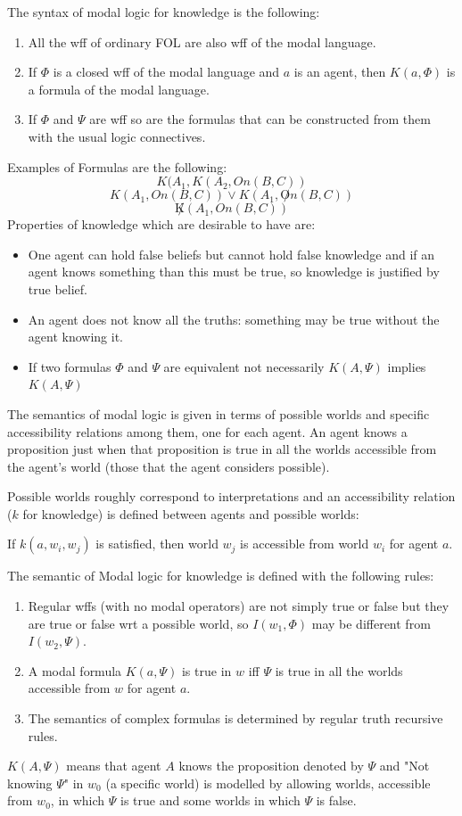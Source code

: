 The syntax of modal logic for knowledge is the following:
\begin{enumerate}
   \item All the wff of ordinary FOL are also wff of the modal language.
   \item If $\Phi$ is a closed wff of the modal language and $a$ is an agent, 
	 then $K(a, \Phi)$ is a formula of the modal language.
   \item If $\Phi$ and $\Psi$ are wff so are the formulas that can be constructed
	 from them with the usual logic connectives.
\end{enumerate}
Examples of Formulas are the following:
\[ K(A_1, K(A_2 , On(B, C)) \]
\[ K(A_1, On(B, C)) \lor K(A_1 , \not On(B, C)) \]
\[ \not K(A_1, On(B, C )) \]
Properties of knowledge which are desirable to have are:
\begin{itemize}
 \item One agent can hold false beliefs but cannot hold false knowledge and if an agent
       knows something than this must be true, so knowledge is justified by true belief.
 \item An agent does not know all the truths: something may be true without the agent
       knowing it.
 \item If two formulas $\Phi$ and $\Psi$ are equivalent not necessarily $K(A, \Psi)$
       implies $K(A , \Psi)$
\end{itemize}
The semantics of modal logic is given in terms of possible worlds and specific
accessibility relations among them, one for each agent.\newline
An agent knows a proposition just when that proposition is true in all the worlds
accessible from the agent’s world (those that the agent considers possible).

Possible worlds roughly correspond to interpretations and an accessibility relation
($k$ for knowledge) is defined between agents and possible worlds:
\begin{defi}
	If $k(a, w_i, w_j)$ is satisfied, then world $w_j$ is accessible from 
	world $w_i$ for agent $a$.
\end{defi}
The semantic of Modal logic for knowledge is defined with the following rules:
\begin{enumerate}
  \item Regular wffs (with no modal operators) are not simply true or false but
	they are true or false wrt a possible world, so $I(w_1, \Phi)$ may be 
        different from $I(w_2, \Psi)$.
  \item A modal formula $K(a, \Psi)$ is true in $w$ iff $\Psi$ is true in all the worlds
	accessible from $w$ for agent $a$.
  \item The semantics of complex formulas is determined by regular truth recursive rules.
\end{enumerate}
$K(A, \Psi)$ means that agent $A$ knows the proposition denoted by $\Psi$ and 
"Not knowing $\Psi$" in $w_0$ (a specific world) is modelled by allowing worlds,
accessible from $w_0$, in which $\Psi$ is true and some worlds in which $\Psi$ is false.


